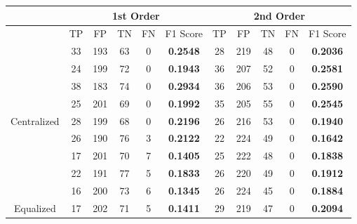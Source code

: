 \documentclass[10pt,a4paper]{article}
\begin{document}
		\begin{table}[!h]
			\centering
			\begin{tabular}{|c|c|c|c|c|c|c|c|c|c|c|}
				\hline
				& \multicolumn{5}{c|}{1st Order}                                                    & \multicolumn{5}{c|}{2nd Order}                              \\ \hline
				& TP & FP  & TN & FN                       & F1 Score                               & TP & FP  & TN & FN & F1 Score                               \\ \hline
				& 33 & 193 & 63 & {\color[HTML]{333333} 0} & {\color[HTML]{FE0000} \textbf{0.2548}} & 28 & 219 & 48 & 0  & {\color[HTML]{FE0000} \textbf{0.2036}} \\ \cline{2-11} 
				& 24 & 199 & 72 & {\color[HTML]{333333} 0} & {\color[HTML]{FE0000} \textbf{0.1943}} & 36 & 207 & 52 & 0  & {\color[HTML]{FE0000} \textbf{0.2581}} \\ \cline{2-11} 
				& 38 & 183 & 74 & {\color[HTML]{333333} 0} & {\color[HTML]{FE0000} \textbf{0.2934}} & 36 & 206 & 53 & 0  & {\color[HTML]{FE0000} \textbf{0.2590}} \\ \cline{2-11} 
				& 25 & 201 & 69 & {\color[HTML]{333333} 0} & {\color[HTML]{FE0000} \textbf{0.1992}} & 35 & 205 & 55 & 0  & {\color[HTML]{FE0000} \textbf{0.2545}} \\ \cline{2-11} 
				\multirow{-5}{*}{Centralized} & 28 & 199 & 68 & {\color[HTML]{333333} 0} & {\color[HTML]{FE0000} \textbf{0.2196}} & 26 & 216 & 53 & 0  & {\color[HTML]{FE0000} \textbf{0.1940}} \\ \hline
				& 26 & 190 & 76 & {\color[HTML]{333333} 3} & {\color[HTML]{FE0000} \textbf{0.2122}} & 22 & 224 & 49 & 0  & {\color[HTML]{FE0000} \textbf{0.1642}} \\ \cline{2-11} 
				& 17 & 201 & 70 & {\color[HTML]{333333} 7} & {\color[HTML]{FE0000} \textbf{0.1405}} & 25 & 222 & 48 & 0  & {\color[HTML]{FE0000} \textbf{0.1838}} \\ \cline{2-11} 
				& 22 & 191 & 77 & {\color[HTML]{333333} 5} & {\color[HTML]{FE0000} \textbf{0.1833}} & 26 & 220 & 49 & 0  & {\color[HTML]{FE0000} \textbf{0.1912}} \\ \cline{2-11} 
				& 16 & 200 & 73 & {\color[HTML]{333333} 6} & {\color[HTML]{FE0000} \textbf{0.1345}} & 26 & 224 & 45 & 0  & {\color[HTML]{FE0000} \textbf{0.1884}} \\ \cline{2-11} 
				\multirow{-5}{*}{Equalized}   & 17 & 202 & 71 & {\color[HTML]{333333} 5} & {\color[HTML]{FE0000} \textbf{0.1411}} & 29 & 219 & 47 & 0  & {\color[HTML]{FE0000} \textbf{0.2094}} \\ \hline
			\end{tabular}
		\end{table}
	
\end{document}
